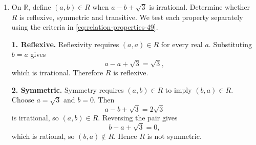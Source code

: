 \begin{enumerate}[leftmargin=4mm,itemsep=9pt]
\[\[\[\[\paragraph*{Functions and relations}
\item Discuss continuity and differentiability of $f(x)=|x|+|x-1|$ on $(-1,2)$.
\solution Interpret $f$ as a piecewise-linear static characteristic. With $r^+=\max(r,0)$,
\[
f(x)=1+2(-x)^++2(x-1)^+.
\]
Resolving the two switching points gives
\[
f(x)=
\begin{cases}
1-2x,&-1<x<0,\\
1,&0\le x<1,\\
2x-1,&1\le x<2.
\end{cases}
\]
At $x=0$ and $x=1$, the adjacent branches agree and equal $1$; thus the characteristic is continuous on $(-1,2)$.

On each smooth segment, the incremental gain is constant:
\[
f'(x)=
\begin{cases}
-2,&-1<x<0,\\
0,&0<x<1,\\
2,&1<x<2.
\end{cases}
\]
At the switching points the one-sided gains disagree:
\[
f'_-(0)=-2\ne0=f'_+(0),\qquad
f'_-(1)=0\ne2=f'_+(1).
\]
The classical derivative therefore fails exactly at $0$ and $1$. The slope is nondecreasing across the breakpoints, so the characteristic is convex. Its Clarke generalized derivatives are
\[
\partial_C f(0)=[-2,0],\qquad \partial_C f(1)=[0,2].
\]
Since every segment has slope magnitude at most $2$, the complete piecewise characteristic is globally Lipschitz with the sharp constant
\[
|f(x_2)-f(x_1)|\le2|x_2-x_1|,\qquad x_1,x_2\in(-1,2).
\]
Thus it is continuous and bounded on the stated interval, but nonsmooth at the two switching points.
\item On $\mathbb R$, define $(a,b)\in R$ when $a-b+\sqrt3$ is irrational. Determine whether $R$ is reflexive, symmetric and transitive.
\solution We test each property separately using the criteria in \eqref{eq:relation-properties-49}.

\textbf{1. Reflexive.} Reflexivity requires $(a,a)\in R$ for every real $a$. Substituting $b=a$ gives
\[
a-a+\sqrt3=\sqrt3,
\]
which is irrational. Therefore $R$ is reflexive.

\textbf{2. Symmetric.} Symmetry requires $(a,b)\in R$ to imply $(b,a)\in R$. Choose $a=\sqrt3$ and $b=0$. Then
\[
a-b+\sqrt3=2\sqrt3
\]
is irrational, so $(a,b)\in R$. Reversing the pair gives
\[
b-a+\sqrt3=0,
\]
which is rational, so $(b,a)\notin R$. Hence $R$ is not symmetric.

\]\]\]\]
\end{enumerate}
